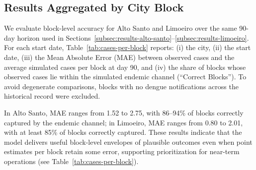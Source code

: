\subsection{Results Aggregated by City Block}
We evaluate block-level accuracy for Alto Santo and Limoeiro over the same 90-day horizon used in Sections~\ref{subsec:results-alto-santo}–\ref{subsec:results-limoeiro}. For each start date, Table~\ref{tab:cases-per-block} reports: (i) the city, (ii) the start date, (iii) the Mean Absolute Error (MAE) between observed cases and the average simulated cases per block at day 90, and (iv) the share of blocks whose observed cases lie within the simulated endemic channel (“Correct Blocks”). To avoid degenerate comparisons, blocks with no dengue notifications across the historical record were excluded.

In Alto Santo, MAE ranges from 1.52 to 2.75, with 86–94\% of blocks correctly captured by the endemic channel; in Limoeiro, MAE ranges from 0.80 to 2.01, with at least 85\% of blocks correctly captured. These results indicate that the model delivers useful block-level envelopes of plausible outcomes even when point estimates per block retain some error, supporting prioritization for near-term operations (see Table~\ref{tab:cases-per-block}). 

